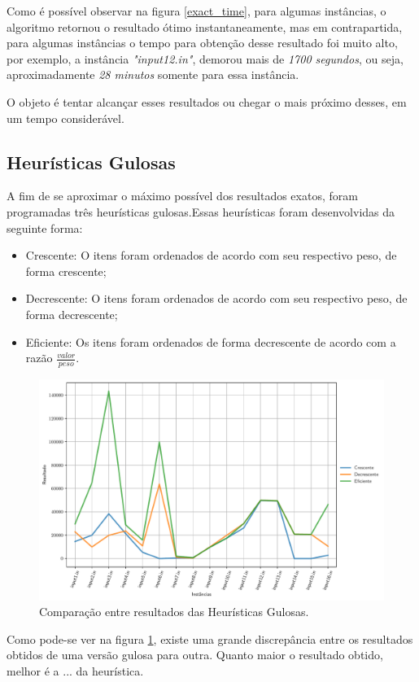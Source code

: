 \documentclass[a4paper, 12pt]{article}
\begin{document}
Como é possível observar na figura \ref{exact_time}, para algumas instâncias, o algoritmo retornou
o resultado ótimo instantaneamente, mas em contrapartida, para algumas instâncias o
tempo para obtenção desse resultado foi muito alto, por exemplo, a instância \textit{"input12.in"},
demorou mais de \textit{1700 segundos}, ou seja, aproximadamente \textit{28 minutos} somente para essa instância.

O objeto é tentar alcançar esses resultados ou chegar o mais próximo desses, em um tempo considerável.

\newpage
\subsection{Heurísticas Gulosas}
A fim de se aproximar o máximo possível dos resultados exatos, foram programadas três heurísticas gulosas.Essas heurísticas foram desenvolvidas da seguinte forma:
\begin{itemize}
    \item Crescente: O itens foram ordenados de acordo com seu respectivo peso, de forma crescente;
    \item Decrescente: O itens foram ordenados de acordo com seu respectivo peso, de forma decrescente;
    \item Eficiente: Os itens foram ordenados de forma decrescente de acordo com a razão $\frac{valor}{peso}$.
\end{itemize}

\begin{figure}[!htb]
    \centering
    \includegraphics[width=0.8\linewidth]{../imgs/greedy_compare.pdf}
    \caption{Comparação entre resultados das Heurísticas Gulosas.}
    \label{greedy_compare}
\end{figure}

Como pode-se ver na figura \ref{greedy_compare}, existe uma grande discrepância entre os resultados obtidos 
de uma versão gulosa para outra. Quanto maior o resultado obtido, melhor é a ... da heurística. 
\end{document}
